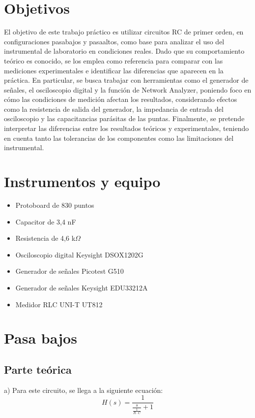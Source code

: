 \documentclass{article}
\begin{document}
\section{Objetivos}
El objetivo de este trabajo práctico es utilizar circuitos RC de primer orden, en configuraciones pasabajos y pasaaltos, como base para analizar el uso del instrumental de laboratorio en condiciones reales. Dado que su comportamiento teórico es conocido, se los emplea como referencia para comparar con las mediciones experimentales e identificar las diferencias que aparecen en la práctica. En particular, se busca trabajar con herramientas como el generador de señales, el osciloscopio digital y la función de Network Analyzer, poniendo foco en cómo las condiciones de medición afectan los resultados, considerando efectos como la resistencia de salida del generador, la impedancia de entrada del osciloscopio y las capacitancias parásitas de las puntas. Finalmente, se pretende interpretar las diferencias entre los resultados teóricos y experimentales, teniendo en cuenta tanto las tolerancias de los componentes como las limitaciones del instrumental.

\section{Instrumentos y equipo}
    \begin{itemize}
        \item Protoboard de 830 puntos
        \item Capacitor de 3,4 nF
        \item Resistencia de 4,6 k$\Omega$
        \item Osciloscopio digital Keysight DSOX1202G
        \item Generador de señales Picotest G510
        \item Generador de señales Keysight EDU33212A
        \item Medidor RLC UNI-T UT812
    \end{itemize}

    \newpage

%

    \section{Pasa bajos}
    \subsection{Parte teórica}
    a) Para este circuito, se llega a la siguiente ecuación: 
    \begin{equation}
H(s)=\frac{1}{\frac{s}{\frac{1}{R \cdot C}}+1}
\label{eq:pasabajos}
\end{equation}
\end{document}
